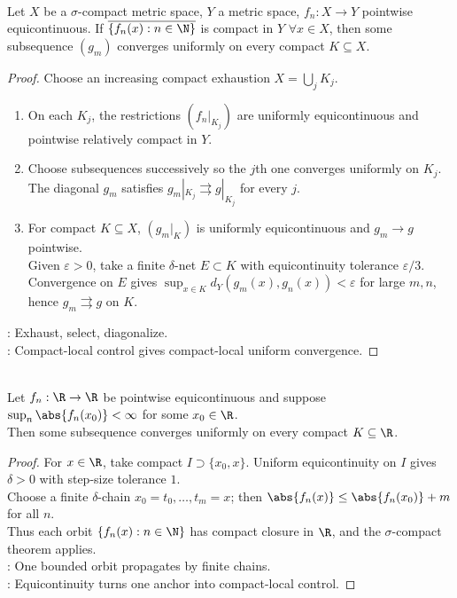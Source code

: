 \begin{theorem} \label{thm:arzela-ascoli-sigma-compact-locally-uniform} \\
Let $X$ be a $\sigma$-compact metric space, $Y$ a metric space, $f_n:X\to Y$ pointwise equicontinuous. If $\overline{\{f_n(x):n\in\N\}}$ is compact in $Y$ $\forall x\in X$, then some subsequence $(g_m)$ converges uniformly on every compact $K\subseteq X$.
\begin{proof}
Choose an increasing compact exhaustion $X=\bigcup_jK_j$.
\begin{enumerate}[label=(\roman*)]
\setlength{\itemsep}{0pt}
\item On each $K_j$, the restrictions $(f_n|_{K_j})$ are uniformly equicontinuous and pointwise relatively compact in $Y$.
\item Choose subsequences successively so the $j$th one converges uniformly on $K_j$.\\
The diagonal $g_m$ satisfies $g_m|_{K_j}\rightrightarrows g|_{K_j}$ for every $j$.
\item For compact $K\subseteq X$, $(g_m|_K)$ is uniformly equicontinuous and $g_m\to g$ pointwise.\\
Given $\varepsilon>0$, take a finite $\delta$-net $E\subset K$ with equicontinuity tolerance $\varepsilon/3$.\\
Convergence on $E$ gives $\sup_{x\in K}d_Y(g_m(x),g_n(x))<\varepsilon$ for large $m,n$, hence $g_m\rightrightarrows g$ on $K$.
\end{enumerate}
: Exhaust, select, diagonalize.\\
: Compact-local control gives compact-local uniform convergence.
\end{proof}
\end{theorem}

\begin{corollary} \label{cor:arzela-ascoli-real-line-locally-uniform} \\
Let $f_n:\R\to\R$ be pointwise equicontinuous and suppose $\sup_n\abs{f_n(x_0)}<\infty$ for some $x_0\in\R$.\\
Then some subsequence converges uniformly on every compact $K\subseteq\R$.
\begin{proof} For $x\in\R$, take compact $I\supset\{x_0,x\}$. Uniform equicontinuity on $I$ gives $\delta>0$ with step-size tolerance $1$.\\
Choose a finite $\delta$-chain $x_0=t_0,\ldots,t_m=x$; then $\abs{f_n(x)}\leq\abs{f_n(x_0)}+m$ for all $n$.\\
Thus each orbit $\{f_n(x):n\in\N\}$ has compact closure in $\R$, and the $\sigma$-compact theorem applies.\\
: One bounded orbit propagates by finite chains.\\
: Equicontinuity turns one anchor into compact-local control.
\end{proof}
\end{corollary}

